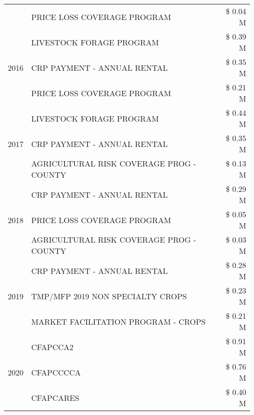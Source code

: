 \begin{tabular}{llr}
 & PRICE LOSS COVERAGE PROGRAM & \$ 0.04 M \\
\cline{1-3}
\multirow[t]{3}{*}{2016} & LIVESTOCK FORAGE PROGRAM & \$ 0.39 M \\
 & CRP PAYMENT - ANNUAL RENTAL & \$ 0.35 M \\
 & PRICE LOSS COVERAGE PROGRAM & \$ 0.21 M \\
\cline{1-3}
\multirow[t]{3}{*}{2017} & LIVESTOCK FORAGE PROGRAM & \$ 0.44 M \\
 & CRP PAYMENT - ANNUAL RENTAL & \$ 0.35 M \\
 & AGRICULTURAL RISK COVERAGE PROG - COUNTY & \$ 0.13 M \\
\cline{1-3}
\multirow[t]{3}{*}{2018} & CRP PAYMENT - ANNUAL RENTAL & \$ 0.29 M \\
 & PRICE LOSS COVERAGE PROGRAM & \$ 0.05 M \\
 & AGRICULTURAL RISK COVERAGE PROG - COUNTY & \$ 0.03 M \\
\cline{1-3}
\multirow[t]{3}{*}{2019} & CRP PAYMENT - ANNUAL RENTAL & \$ 0.28 M \\
 & TMP/MFP 2019 NON SPECIALTY CROPS & \$ 0.23 M \\
 & MARKET FACILITATION PROGRAM - CROPS & \$ 0.21 M \\
\cline{1-3}
\multirow[t]{3}{*}{2020} & CFAPCCA2 & \$ 0.91 M \\
 & CFAPCCCCA & \$ 0.76 M \\
 & CFAPCARES & \$ 0.40 M \\
\cline{1-3}
\bottomrule
\end{tabular}
